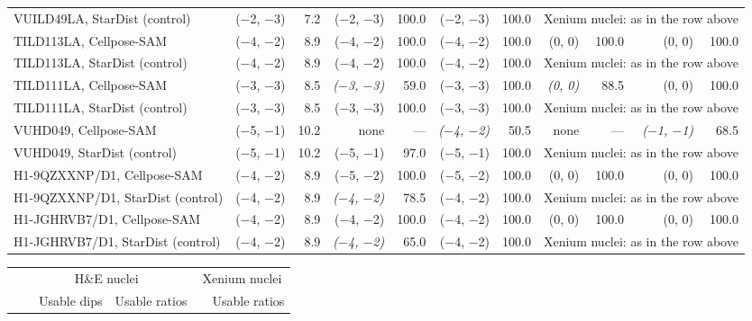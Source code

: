 {\begin{table}[H]
\begin{tabular}{lrrrrrrrrrr}
VUILD49LA, StarDist (control) & ($-$2, $-$3) & 7.2 & ($-$2, $-$3) & 100.0 & ($-$2, $-$3) & 100.0 & \multicolumn{4}{c}{Xenium nuclei: as in the row above} \\
TILD113LA, Cellpose-SAM & ($-$4, $-$2) & 8.9 & ($-$4, $-$2) & 100.0 & ($-$4, $-$2) & 100.0 & (0, 0) & 100.0 & (0, 0) & 100.0 \\
TILD113LA, StarDist (control) & ($-$4, $-$2) & 8.9 & ($-$4, $-$2) & 100.0 & ($-$4, $-$2) & 100.0 & \multicolumn{4}{c}{Xenium nuclei: as in the row above} \\
TILD111LA, Cellpose-SAM & ($-$3, $-$3) & 8.5 & \textit{($-$3, $-$3)} & 59.0 & ($-$3, $-$3) & 100.0 & \textit{(0, 0)} & 88.5 & (0, 0) & 100.0 \\
TILD111LA, StarDist (control) & ($-$3, $-$3) & 8.5 & ($-$3, $-$3) & 100.0 & ($-$3, $-$3) & 100.0 & \multicolumn{4}{c}{Xenium nuclei: as in the row above} \\
VUHD049, Cellpose-SAM & ($-$5, $-$1) & 10.2 & none & --- & \textit{($-$4, $-$2)} & 50.5 & none & --- & \textit{($-$1, $-$1)} & 68.5 \\
VUHD049, StarDist (control) & ($-$5, $-$1) & 10.2 & ($-$5, $-$1) & 97.0 & ($-$5, $-$1) & 100.0 & \multicolumn{4}{c}{Xenium nuclei: as in the row above} \\
H1-9QZXXNP/D1, Cellpose-SAM & ($-$4, $-$2) & 8.9 & ($-$5, $-$2) & 100.0 & ($-$5, $-$2) & 100.0 & (0, 0) & 100.0 & (0, 0) & 100.0 \\
H1-9QZXXNP/D1, StarDist (control) & ($-$4, $-$2) & 8.9 & \textit{($-$4, $-$2)} & 78.5 & ($-$4, $-$2) & 100.0 & \multicolumn{4}{c}{Xenium nuclei: as in the row above} \\
H1-JGHRVB7/D1, Cellpose-SAM & ($-$4, $-$2) & 8.9 & ($-$4, $-$2) & 100.0 & ($-$4, $-$2) & 100.0 & (0, 0) & 100.0 & (0, 0) & 100.0 \\
H1-JGHRVB7/D1, StarDist (control) & ($-$4, $-$2) & 8.9 & \textit{($-$4, $-$2)} & 65.0 & ($-$4, $-$2) & 100.0 & \multicolumn{4}{c}{Xenium nuclei: as in the row above} \\
\bottomrule
\end{tabular}
\par\medskip
\begin{tabular}{lrrrrrrrrrr}
\toprule
 & \multicolumn{6}{c}{H\&E nuclei} & \multicolumn{4}{c}{Xenium nuclei} \\
\cmidrule(lr){2-7}\cmidrule(l){8-11}
 & & \multicolumn{2}{c}{Usable dips} & \multicolumn{3}{c}{Usable ratios} & & \multicolumn{3}{c}{Usable ratios} \\
\cmidrule(lr){3-4}\cmidrule(lr){5-7}\cmidrule(l){9-11}

\end{tabular}
\end{table}}
